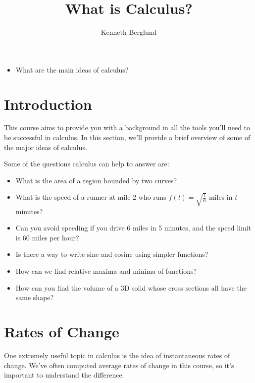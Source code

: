 \documentclass{ximera}
\author{Kenneth Berglund}
\title{What is Calculus?}
\begin{document}
\begin{abstract}
\end{abstract}
\maketitle
%
%
%
\begin{motivatingQuestions}\begin{itemize}
\item What are the main ideas of calculus?
\end{itemize}\end{motivatingQuestions}
%
%
%
\section{Introduction}
%
This course aims to provide you with a background in all the tools you'll need to be successful in calculus. In this section, we'll provide a brief overview of some of the major ideas of calculus. 

Some of the questions calculus can help to answer are:
\begin{itemize}
\item What is the area of a region bounded by two curves?
\item What is the speed of a runner at mile 2 who runs $f(t) = \sqrt{\frac{t}{6}}$ miles in $t$ minutes? 
\item Can you avoid speeding if you drive 6 miles in 5 minutes, and the speed limit is 60 miles per hour?
\item Is there a way to write sine and cosine using simpler functions?
\item How can we find relative maxima and minima of functions?
\item How can you find the volume of a 3D solid whose cross sections all have the same shape?
\end{itemize}


\section{Rates of Change}
One extremely useful topic in calculus is the idea of instantaneous rates of change. We've often computed average rates of change in this course, so it's important to understand the difference.
\end{document}
